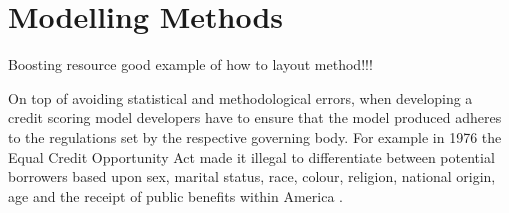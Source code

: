 \chapter{Modelling Methods} 
\label{Chapter4}

Boosting resource good example of how to layout method!!!  \parencite{Ensemble}


On top of avoiding statistical and methodological errors, when developing a credit scoring model developers have to ensure that the model produced adheres to the regulations set by the respective governing body. For example in 1976 the Equal Credit Opportunity Act made it illegal to differentiate between potential borrowers based upon sex, marital status, race, colour, religion, national origin, age and the receipt of public benefits within America \parencite{CreditScoringReadings}. 
